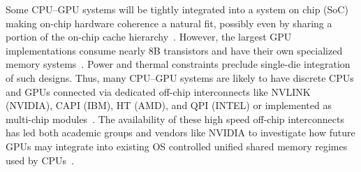 Some CPU--GPU systems will be tightly integrated into a system on chip (SoC) making on-chip 
hardware coherence a natural fit, possibly even by sharing a portion of the on-chip 
cache hierarchy~\cite{HSA,AMDAPU,Hechtman2014}.  However, the largest GPU 
implementations consume nearly 8B transistors and have their own 
specialized memory systems~\cite{NVIDIA8BILLION}.  
Power and thermal constraints preclude single-die integration of such designs. 
Thus, many CPU--GPU systems are likely to have 
discrete CPUs and GPUs connected via dedicated off-chip interconnects like 
NVLINK (NVIDIA), CAPI (IBM), HT (AMD), and QPI (INTEL) or implemented as 
multi-chip modules~\cite{NVLINK,CAPI,AMDHT,INTELQPI,Chen92}. The availability of these
high speed off-chip interconnects has led both academic groups and vendors like NVIDIA
to investigate how future GPUs may integrate into existing OS controlled 
unified shared memory regimes used by
CPUs~\cite{Pichai2014,Power2014,ref:agarwal:asplos2015,ref:agarwal:hpca2015}.

